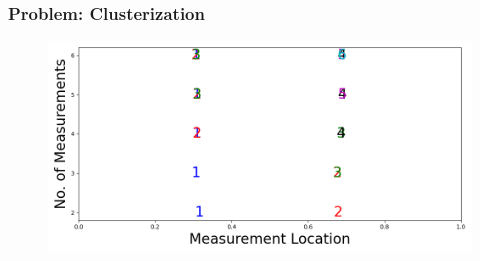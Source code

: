 \documentclass{beamer}
\begin{document}
  



\begin{frame}
\frametitle{Problem: Clusterization}
\begin{figure}
  \centering
  \includegraphics[height=0.5\textwidth]{dst_modelError0.png}
\end{figure}

\end{frame}
\end{document}
